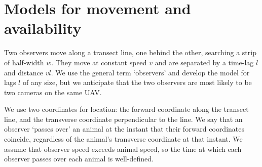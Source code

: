 \documentclass[useAMS, usenatbib, referee]{biom}\usepackage[]{graphicx}\usepackage[]{color}
\begin{document}



\section{Models for movement and availability\label{sec:genmod}}


Two observers move along a transect line, one behind the other, searching a strip of half-width $w$. They move at constant speed $v$ and are separated by a time-lag $l$ and distance $vl$. We use the general term `observers' and develop the model for lags $l$ of any size, but we anticipate that the two observers are most likely to be two cameras on the same UAV.

We use two coordinates for location: the forward coordinate along the transect line, and the transverse coordinate perpendicular to the line. We say that an observer `passes over' an animal at the instant that their forward coordinates coincide, regardless of the animal's transverse coordinate at that instant. We assume that observer speed exceeds animal speed, so the time at which each observer passes over each animal is well-defined.
\end{document}
